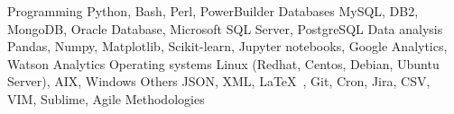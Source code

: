 %
%
%

    \begin{keywords}
        \keywordsentry
            {Programming}
            {
                Python,
                Bash,
                Perl,
                PowerBuilder
            }
        \keywordsentry
            {Databases}
            {
                MySQL,
                DB2,
                MongoDB,
                Oracle Database, 
                Microsoft SQL Server,
                PostgreSQL
            }
        \keywordsentry
            {Data analysis}
            {
                Pandas,
                Numpy,
                Matplotlib,
                Scikit-learn,
                Jupyter notebooks,
                Google Analytics,
                Watson Analytics
            }
        \keywordsentry
            {Operating systems}
            {
                Linux (Redhat, Centos, Debian, Ubuntu Server),
                AIX,
                Windows
            }
        \keywordsentry
            {Others}
            {
                JSON,
                XML,
                \LaTeX\ ,
                Git,
                Cron,
                Jira,
                CSV,
                VIM, 
                Sublime,
                Agile Methodologies
            }
    \end{keywords}
